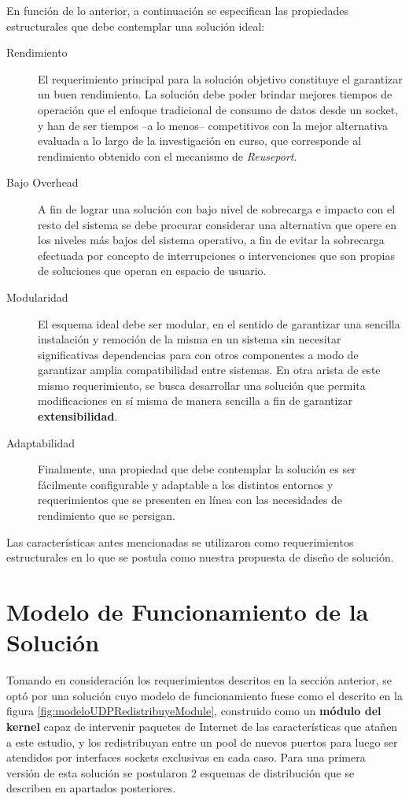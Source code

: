 En función de lo anterior, a continuación se especifican las propiedades estructurales que debe contemplar una solución ideal:

\begin{description}
\item[Rendimiento] El requerimiento principal para la solución objetivo constituye el garantizar un buen rendimiento. La solución debe poder brindar mejores tiempos de operación que el enfoque tradicional de consumo de datos desde un socket, y han de ser tiempos --a lo menos-- competitivos con la mejor alternativa evaluada a lo largo de la investigación en curso, que corresponde al rendimiento obtenido con el mecanismo de \emph{Reuseport}.
\item[Bajo Overhead] A fin de lograr una solución con bajo  nivel de sobrecarga e impacto con el resto del sistema se debe procurar considerar una alternativa que opere en los niveles más bajos del sistema operativo, a fin de evitar la sobrecarga efectuada por concepto de interrupciones o intervenciones que son propias de soluciones que operan en espacio de usuario.
\item[Modularidad] El esquema ideal debe ser modular, en el sentido de garantizar una sencilla instalación y remoción de la misma en un sistema sin necesitar significativas dependencias para con otros componentes a modo de garantizar amplia compatibilidad entre sistemas. En otra arista de este mismo requerimiento, se busca desarrollar una solución que permita modificaciones en sí misma de manera sencilla a fin de garantizar \textbf{extensibilidad}.
\item[Adaptabilidad] Finalmente, una propiedad que debe contemplar la solución es ser fácilmente configurable y adaptable a los distintos entornos y requerimientos que se presenten en línea con las necesidades de rendimiento que se persigan.
\end{description}

Las características antes mencionadas se utilizaron como requerimientos estructurales en lo que se postula como nuestra propuesta de diseño de solución.

\section{Modelo de Funcionamiento de la Solución}
Tomando en consideración los requerimientos descritos en la sección anterior, se optó por una solución cuyo modelo de funcionamiento fuese como el descrito en la figura \ref{fig:modeloUDPRedistribuyeModule}, construido como un \textbf{módulo del kernel} capaz de intervenir paquetes de Internet de las características que atañen a este estudio, y los redistribuyan entre un pool de nuevos puertos para luego ser atendidos por interfaces sockets exclusivas en cada caso. Para una primera versión de esta solución se postularon 2 esquemas de distribución que se describen en apartados posteriores.

